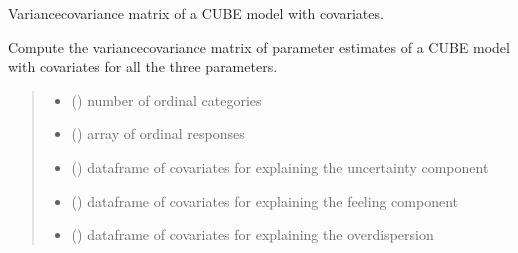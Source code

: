 \documentclass[letterpaper,10pt,english]{sphinxmanual}
\begin{document}
\begin{fulllineitems}
\label{\detokenize{cubmods:cubmods.cube_ywz.varcov}}
\pysigstartsignatures
{}
\pysigstopsignatures
\sphinxAtStartPar
Variance\sphinxhyphen{}covariance matrix of a CUBE model with covariates.

\sphinxAtStartPar
Compute the variance\sphinxhyphen{}covariance matrix of parameter estimates of a CUBE model with covariates
for all the three parameters.
\begin{quote}\begin{description}
\begin{itemize}
\item {} 
\sphinxAtStartPar
{} () \textendash{} number of ordinal categories

\item {} 
\sphinxAtStartPar
{} () \textendash{} array of ordinal responses

\item {} 
\sphinxAtStartPar
{} () \textendash{} dataframe of covariates for explaining the uncertainty component

\item {} 
\sphinxAtStartPar
{} () \textendash{} dataframe of covariates for explaining the feeling component

\item {} 
\sphinxAtStartPar
{} () \textendash{} dataframe of covariates for explaining the overdispersion


\end{itemize}
\end{description}
\end{quote}
\end{fulllineitems}
\end{document}
